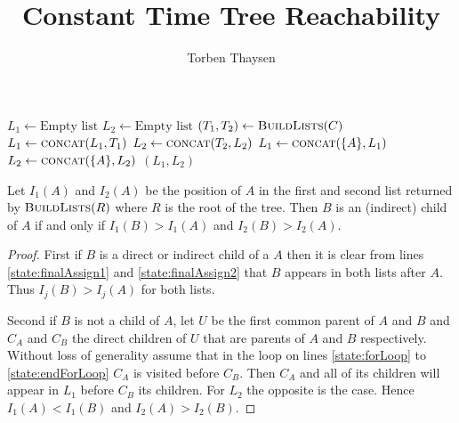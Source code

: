 \documentclass[a4paper, 12pt]{article}
\author{Torben Thaysen}
\title{Constant Time Tree Reachability}
\begin{document}
\maketitle

\begin{algorithmic}[1]
\State $L_1 \gets \text{Empty list}$
\State $L_2 \gets \text{Empty list}$
 \label{state:forLoop}
	\State $(T_1, T_2) \gets \Call{BuildLists}{C}$
	\State $L_1 \gets \Call{concat}{L_1, T_1}$
	\State $L_2 \gets \Call{concat}{T_2, L_2}$
\EndFor \label{state:endForLoop}
\State $L_1 \gets \Call{concat}{\{A\}, L_1}$ \label{state:finalAssign1}
\State $L_2 \gets \Call{concat}{\{A\}, L_2}$ \label{state:finalAssign2}
\State \Return $(L_1, L_2)$
\EndFunction
\end{algorithmic}
Let $I_1(A)$ and $I_2(A)$ be the position of $A$ in the first and second list returned by $\Call{BuildLists}{R}$ where $R$ is the root of the tree. Then $B$ is an (indirect) child of $A$ if and only if $I_1(B) > I_1(A)$ and $I_2(B) > I_2(A)$.

\begin{proof}
First if $B$ is a direct or indirect child of a $A$ then it is clear from lines \ref{state:finalAssign1} and \ref{state:finalAssign2} that $B$ appears in both lists after $A$. Thus $I_j(B) > I_j(A)$ for both lists.
\par\noindent
Second if $B$ is not a child of $A$, let $U$ be the first common parent of $A$ and $B$ and $C_A$ and $C_B$ the direct children of $U$ that are parents of $A$ and $B$ respectively. Without loss of generality assume that in the loop on lines \ref{state:forLoop} to \ref{state:endForLoop} $C_A$ is visited before $C_B$. Then $C_A$ and all of its children will appear in $L_1$ before $C_B$ its children. For $L_2$ the opposite is the case. Hence $I_1(A) < I_1(B)$ and $I_2(A) > I_2(B)$.
\end{proof}
\end{document}
